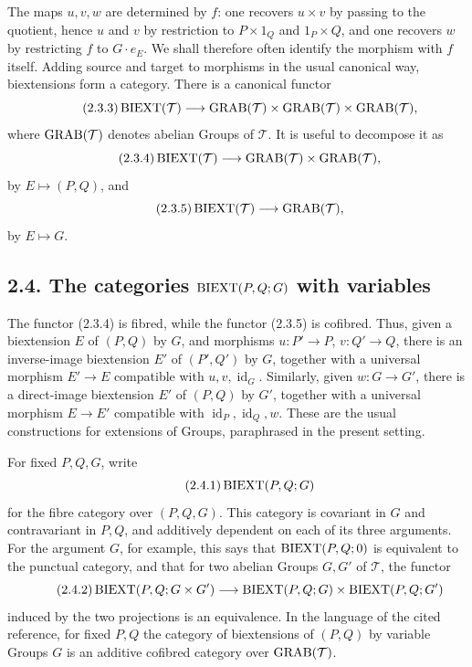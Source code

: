 \documentclass[11pt]{article}
\providecommand{\id}{\operatorname{id}}
\begin{document}
The maps \(u,v,w\) are determined by \(f\): one recovers \(u\times v\) by passing to the quotient, hence \(u\) and \(v\) by restriction to \(P\times1_Q\) and \(1_P\times Q\), and one recovers \(w\) by restricting \(f\) to \(G\cdot e_E\).  We shall therefore often identify the morphism with \(f\) itself.  Adding source and target to morphisms in the usual canonical way, biextensions form a category.  There is a canonical functor
\begin{equation}\tag{2.3.3}
  \operatorname{BIEXT}(\mathcal T)\longrightarrow \operatorname{GRAB}(\mathcal T)\times\operatorname{GRAB}(\mathcal T)\times\operatorname{GRAB}(\mathcal T),
\end{equation}
where \(\operatorname{GRAB}(\mathcal T)\) denotes abelian Groups of \(\mathcal T\).  It is useful to decompose it as
\begin{equation}\tag{2.3.4}
  \operatorname{BIEXT}(\mathcal T)\longrightarrow\operatorname{GRAB}(\mathcal T)\times\operatorname{GRAB}(\mathcal T),
\end{equation}
by \(E\mapsto(P,Q)\), and
\begin{equation}\tag{2.3.5}
  \operatorname{BIEXT}(\mathcal T)\longrightarrow\operatorname{GRAB}(\mathcal T),
\end{equation}
by \(E\mapsto G\).

\subsection*{2.4. The categories \(\operatorname{BIEXT}(P,Q;G)\) with variables}
The functor (2.3.4) is fibred, while the functor (2.3.5) is cofibred.  Thus, given a biextension \(E\) of \((P,Q)\) by \(G\), and morphisms \(u:P'\to P\), \(v:Q'\to Q\), there is an inverse-image biextension \(E'\) of \((P',Q')\) by \(G\), together with a universal morphism \(E'\to E\) compatible with \(u,v,\id_G\).  Similarly, given \(w:G\to G'\), there is a direct-image biextension \(E'\) of \((P,Q)\) by \(G'\), together with a universal morphism \(E\to E'\) compatible with \(\id_P,\id_Q,w\).  These are the usual constructions for extensions of Groups, paraphrased in the present setting.

For fixed \(P,Q,G\), write
\begin{equation}\tag{2.4.1}
  \operatorname{BIEXT}(P,Q;G)
\end{equation}
for the fibre category over \((P,Q,G)\).  This category is covariant in \(G\) and contravariant in \(P,Q\), and additively dependent on each of its three arguments.  For the argument \(G\), for example, this says that \(\operatorname{BIEXT}(P,Q;0)\) is equivalent to the punctual category, and that for two abelian Groups \(G,G'\) of \(\mathcal T\), the functor
\begin{equation}\tag{2.4.2}
  \operatorname{BIEXT}(P,Q;G\times G')\longrightarrow
  \operatorname{BIEXT}(P,Q;G)\times\operatorname{BIEXT}(P,Q;G')
\end{equation}
induced by the two projections is an equivalence.  In the language of the cited reference, for fixed \(P,Q\) the category of biextensions of \((P,Q)\) by variable Groups \(G\) is an additive cofibred category over \(\operatorname{GRAB}(\mathcal T)\).
\end{document}
